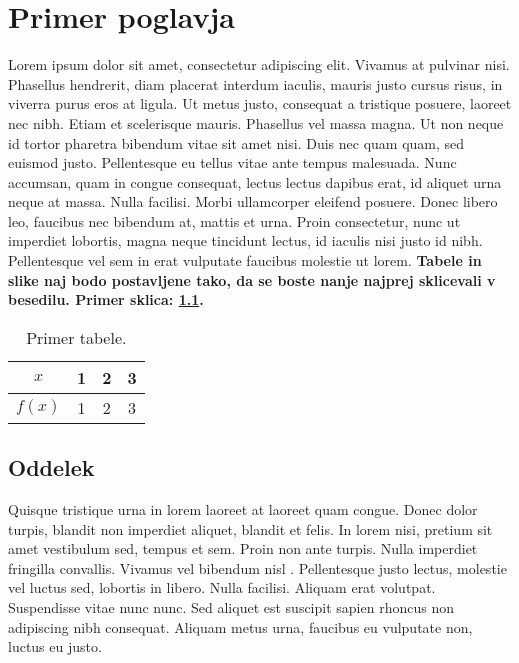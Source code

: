 \chapter{Primer poglavja}

Lorem ipsum dolor sit amet, consectetur adipiscing elit. Vivamus at pulvinar nisi. Phasellus hendrerit, diam placerat interdum iaculis, mauris justo cursus risus, in viverra purus eros at ligula. Ut metus justo, consequat a tristique posuere, laoreet nec nibh. Etiam et scelerisque mauris. Phasellus vel massa magna. Ut non neque id tortor pharetra bibendum vitae sit amet nisi. Duis nec quam quam, sed euismod justo. Pellentesque eu tellus vitae ante tempus malesuada. Nunc accumsan, quam in congue consequat, lectus lectus dapibus erat, id aliquet urna neque at massa. Nulla facilisi. Morbi ullamcorper eleifend posuere. Donec libero leo, faucibus nec bibendum at, mattis et urna. Proin consectetur, nunc ut imperdiet lobortis, magna neque tincidunt lectus, id iaculis nisi justo id nibh. Pellentesque vel sem in erat vulputate faucibus molestie ut lorem. \textbf{Tabele in slike naj bodo postavljene tako, da se boste nanje najprej sklicevali v besedilu. Primer sklica: \ref{tab:primer-tabele}.}
\begin{table}[!htbp]
\begin{center}
    \begin{tabular}{c|ccc}
    $x$ & 1 & 2 & 3\\ \hline 
    $f(x)$ & 1 & 2 & 3
    \end{tabular}
\end{center}
\caption{\label{tab:primer-tabele}Primer tabele.}
\end{table}


\section{Oddelek}

Quisque tristique urna in lorem laoreet at laoreet quam congue. Donec dolor turpis, blandit non imperdiet aliquet, blandit et felis. In lorem nisi, pretium sit amet vestibulum sed, tempus et sem. Proin non ante turpis. Nulla imperdiet fringilla convallis. Vivamus vel bibendum nisl \cite{zazula2004processing}. Pellentesque justo lectus, molestie vel luctus sed, lobortis in libero. Nulla facilisi. Aliquam erat volutpat. Suspendisse vitae nunc nunc. Sed aliquet est suscipit sapien rhoncus non adipiscing nibh consequat. Aliquam metus urna, faucibus eu vulputate non, luctus eu justo.

